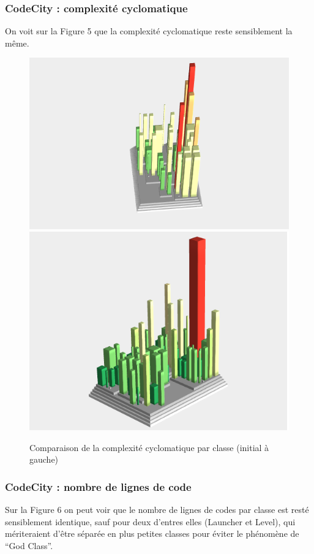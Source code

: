 \documentclass[a4paper,12pt]{report} %
\begin{document}
\subsubsection{CodeCity : complexité cyclomatique}
On voit sur la Figure 5 que la complexité cyclomatique reste sensiblement
la même.

\begin{figure}[!h]
\includegraphics[scale=0.5]{ressources/final_initial_cyclomatic}\includegraphics[scale=0.5]{ressources/final_new_cyclomatic}\caption{Comparaison de la complexité cyclomatique par classe (initial à gauche)}


\end{figure}

\subsubsection{CodeCity : nombre de lignes de code}
Sur la Figure 6 on peut voir que le nombre de lignes de codes par
classe est resté sensiblement identique, sauf pour deux d'entres elles
(Launcher et Level), qui mériteraient d'être séparée en plus petites
classes pour éviter le phénomène de ``God Class''.
\end{document}
